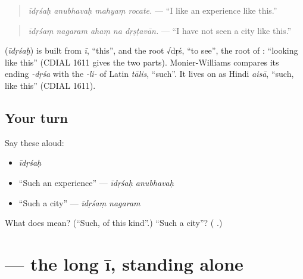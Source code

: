 \begin{quote}
\emph{īdṛśaḥ anubhavaḥ mahyaṃ rocate.} — \textquotedblleft{}I like an experience like this.\textquotedblright{}
\end{quote}

\begin{quote}
\textbf{    }
\end{quote}

\begin{quote}
\emph{īdṛśaṃ nagaram ahaṃ na dṛṣṭavān.} — \textquotedblleft{}I have not seen a city like this.\textquotedblright{}
\end{quote}

\begin{cousinweb}
\textbf{} (\emph{īdṛśaḥ}) is built from \emph{ī}, \textquotedblleft{}this\textquotedblright{}, and the root √dṛś, \textquotedblleft{}to see\textquotedblright{}, the root of \textbf{}: \textquotedblleft{}looking like this\textquotedblright{} (CDIAL 1611 gives the two parts). Monier-Williams compares its ending \emph{-dṛśa} with the \emph{-li-} of Latin \emph{tālis}, \textquotedblleft{}such\textquotedblright{}. It lives on as Hindi \emph{aisā}, \textquotedblleft{}such, like this\textquotedblright{} (CDIAL 1611).
\end{cousinweb}

\subsection*{Your turn}
Say these aloud:

\begin{itemize}
\raggedright
  \item \emph{īdṛśaḥ}
  \item \textquotedblleft{}Such an experience\textquotedblright{} — \emph{īdṛśaḥ anubhavaḥ}
  \item \textquotedblleft{}Such a city\textquotedblright{} — \emph{īdṛśaṃ nagaram}
\end{itemize}

\begin{tcolorbox}[breakable,colback=teal!4,colframe=teal!35!black,title={Before you move on}]
What does \textbf{} mean? (\textquotedblleft{}Such, of this kind\textquotedblright{}.) \textquotedblleft{}Such a city\textquotedblright{}? (\textbf{ }.)
\end{tcolorbox}
\section[\texorpdfstring{\sk{ई} (ī)}{ई (ī)}]{ — the long ī, standing alone}

